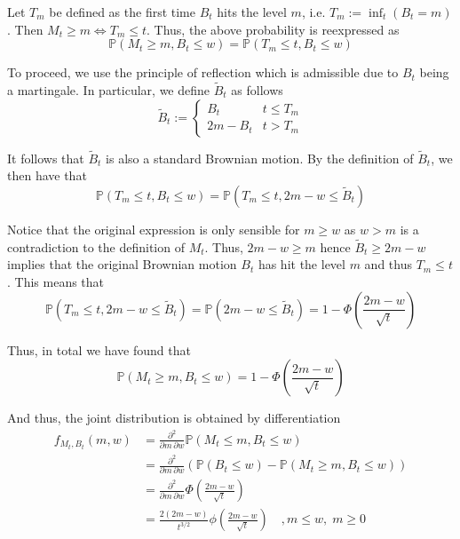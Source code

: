 \documentclass[../Thesis.tex]{subfiles}
\begin{document}
Let $T_m$ be defined as the first time $B_t$ hits the level $m$, i.e. $T_m := \inf_t \left(B_t = m\right)$. Then $M_t \geq m \iff T_m \leq t$. Thus, the above probability is reexpressed as
$$\mathbb{P}\left(M_t \geq m, B_t \leq w\right) = \mathbb{P}\left(T_m \leq t, B_t \leq w\right)$$

To proceed, we use the principle of reflection which is admissible due to $B_t$ being a martingale. In particular, we define $\tilde{B}_t$ as follows
$$\tilde{B}_t := \begin{cases}
        B_t      & t\leq T_m \\
        2m - B_t & t > T_m
    \end{cases}$$

It follows that $\tilde{B}_t$ is also a standard Brownian motion. By the definition of $\tilde{B}_t$, we then have that
$$ \mathbb{P}\left(T_m \leq t, B_t \leq w\right) = \mathbb{P}\left(T_m \leq t, 2m-w \leq \tilde{B}_t\right)$$

Notice that the original expression is only sensible for $m\geq w$ as $w > m$ is a contradiction to the definition of $M_t$. Thus, $2m-w \geq m$ hence $\tilde{B}_t \geq 2m-w$ implies that the original Brownian motion $B_t$ has hit the level $m$ and thus $T_m \leq t$. This means that
$$\mathbb{P}\left(T_m \leq t, 2m-w \leq \tilde{B}_t\right) = \mathbb{P}\left( 2m-w \leq \tilde{B}_t\right) = 1- \Phi \left(\frac{2m-w}{\sqrt{t}}\right)$$

Thus, in total we have found that
$$\mathbb{P}\left(M_t \geq m, B_t \leq w\right) = 1- \Phi \left(\frac{2m-w}{\sqrt{t}}\right)$$

And thus, the joint distribution is obtained by differentiation
\begin{align*}
    f_{M_t, B_t} (m,w) & = \frac{\partial^2}{\partial m \, \partial w} \mathbb{P}\left(M_t \leq m, B_t \leq w\right)                                                  \\
                       & = \frac{\partial^2}{\partial m \, \partial w} \left(\mathbb{P}\left(B_t \leq w\right) - \mathbb{P}\left(M_t \geq m, B_t \leq w\right)\right) \\
                       & = \frac{\partial^2}{\partial m \, \partial w} \Phi \left(\frac{2m-w}{\sqrt{t}}\right)                                                        \\
                       & = \frac{2(2m-w)}{t^{3/2}} \phi\left(\frac{2m-w}{\sqrt{t}}\right)\quad , m\leq w,\; m\geq 0
\end{align*}
\end{document}
